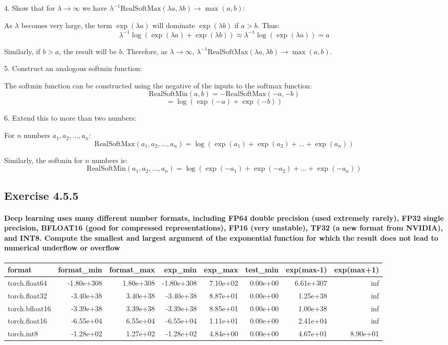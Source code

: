 4. Show that for \( \lambda \to \infty \) we have \( \lambda^{-1} \text{RealSoftMax}(\lambda a, \lambda b) \to \max(a, b) \):

As \( \lambda \) becomes very large, the term \( \exp(\lambda a) \) will dominate \( \exp(\lambda b) \) if \( a > b \). Thus:
\[ \lambda^{-1} \log(\exp(\lambda a) + \exp(\lambda b)) \approx \lambda^{-1} \log(\exp(\lambda a)) = a \]

Similarly, if \( b > a \), the result will be \( b \). Therefore, as \( \lambda \to \infty \), \( \lambda^{-1} \text{RealSoftMax}(\lambda a, \lambda b) \to \max(a, b) \).

5. Construct an analogous softmin function:

The softmin function can be constructed using the negative of the inputs to the softmax function:
\[ \text{RealSoftMin}(a, b) = -\text{RealSoftMax}(-a, -b) \]
\[ = \log(\exp(-a) + \exp(-b)) \]

6. Extend this to more than two numbers:

For \( n \) numbers \( a_1, a_2, \ldots, a_n \):
\[ \text{RealSoftMax}(a_1, a_2, \ldots, a_n) = \log(\exp(a_1) + \exp(a_2) + \ldots + \exp(a_n)) \]

Similarly, the softmin for \( n \) numbers is:
\[ \text{RealSoftMin}(a_1, a_2, \ldots, a_n) = \log(\exp(-a_1) + \exp(-a_2) + \ldots + \exp(-a_n)) \]

\subsection{Exercise 4.5.5}

\paragraph{Deep learning uses many different number formats, including FP64 double precision (used extremely rarely), FP32 single precision, BFLOAT16 (good for compressed representations), FP16 (very unstable), TF32 (a new format from NVIDIA), and INT8. Compute the smallest and largest argument of the exponential function for which the result does not lead to numerical underflow or overflow}

\begin{table}[h!]
\centering
\begin{tabular}{lrrrrrrr}
\toprule
format & format\_min & format\_max & exp\_min & exp\_max & test\_min & exp(max-1) & exp(max+1) \\
\midrule
torch.float64 & -1.80e+308 & 1.80e+308 & -1.80e+308 & 7.10e+02 & 0.00e+00 & 6.61e+307 & inf \\
torch.float32 & -3.40e+38 & 3.40e+38 & -3.40e+38 & 8.87e+01 & 0.00e+00 & 1.25e+38 & inf \\
torch.bfloat16 & -3.39e+38 & 3.39e+38 & -3.39e+38 & 8.85e+01 & 0.00e+00 & 1.00e+38 & inf \\
torch.float16 & -6.55e+04 & 6.55e+04 & -6.55e+04 & 1.11e+01 & 0.00e+00 & 2.41e+04 & inf \\
torch.int8 & -1.28e+02 & 1.27e+02 & -1.28e+02 & 4.84e+00 & 0.00e+00 & 4.67e+01 & 8.90e+01 \\
\bottomrule
\end{tabular}
\end{table}

